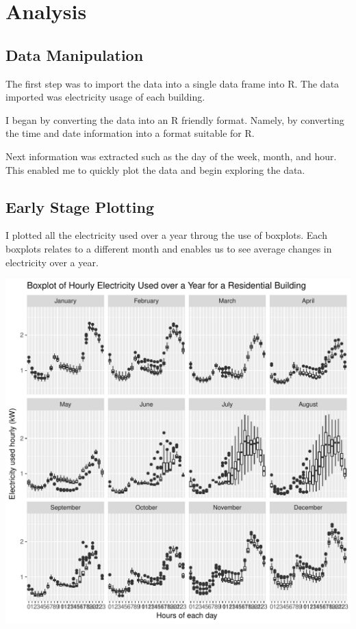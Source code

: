 \documentclass[12pt]{article}\usepackage[]{graphicx}\usepackage[]{color}
\makeatletter
\def\maxwidth{ %
  \ifdim\Gin@nat@width>\linewidth
    \linewidth
  \else
    \Gin@nat@width
  \fi
}
\newenvironment{knitrout}{}{} %
\makeatother
\begin{document}
\section{Analysis}
\subsection{Data Manipulation}





The first step was to import the data into a single data frame into R. The data imported was electricity usage of each building.




I began by converting the data into an R friendly format. Namely, by converting the time and date information into a format suitable for R.




Next information was extracted such as the day of the week, month, and hour. This enabled me to quickly plot the data and begin exploring the data.




\subsection{Early Stage Plotting}

I plotted all the electricity used over a year throug the use of boxplots. Each boxplots relates to a different month and enables us to see average changes in electricity over a year.

\begin{knitrout}
\color{fgcolor}
\includegraphics[width=\maxwidth]{figure/dirtyplots-1} 

\end{knitrout}
\end{document}
